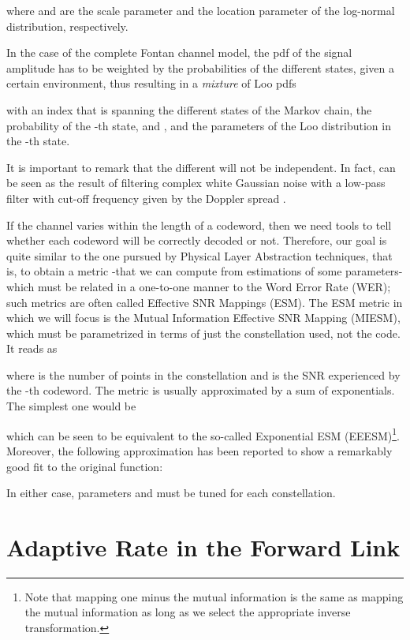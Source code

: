 \documentclass[journal,onecolumn,10pt,a4paper]{IEEEtran}
\begin{document}
where  and  are the scale parameter and the location parameter of the log-normal distribution, respectively.

In the case of the complete Fontan channel model, the pdf of the signal amplitude has to be weighted by the probabilities of the different states, given a certain environment, thus resulting in a \textit{mixture} of Loo pdfs

with  an index that is spanning the  different states of the Markov chain,  the probability of the -th state, and ,  and  the parameters of the Loo distribution in the -th state.

It is important to remark that the different  will not be independent. In fact,  can be seen as the result of filtering complex white Gaussian noise with a low-pass filter with cut-off frequency given by the Doppler spread . 


If the channel varies within the length of a codeword, then we need tools to tell whether each codeword will be correctly decoded or not. Therefore, our goal is quite similar to the one pursued by Physical Layer Abstraction techniques, that is, to obtain a metric -that we can compute from estimations of some parameters- which must be related in a one-to-one manner to the Word Error Rate (WER); such metrics are often called Effective SNR Mappings (ESM). The ESM metric in which we will focus is the Mutual Information Effective SNR Mapping (MIESM)\cite{link_performance}, which must be parametrized in terms of just the constellation used, not the code. It reads as

where  is the number of points in the constellation and  is the SNR experienced by the -th codeword. The metric  is usually approximated by a sum of exponentials. The simplest one would be


which can  be seen to be equivalent to the so-called Exponential ESM (EEESM)\footnote{Note that mapping one minus the mutual information is the same as mapping the mutual information as long as we select the appropriate inverse transformation.}. Moreover, the following approximation has been reported to show a remarkably good fit to the original function:

In either case, parameters  and  must be tuned for each constellation.
\section{Adaptive Rate in the Forward Link}
\label{sec:fl}
\end{document}
